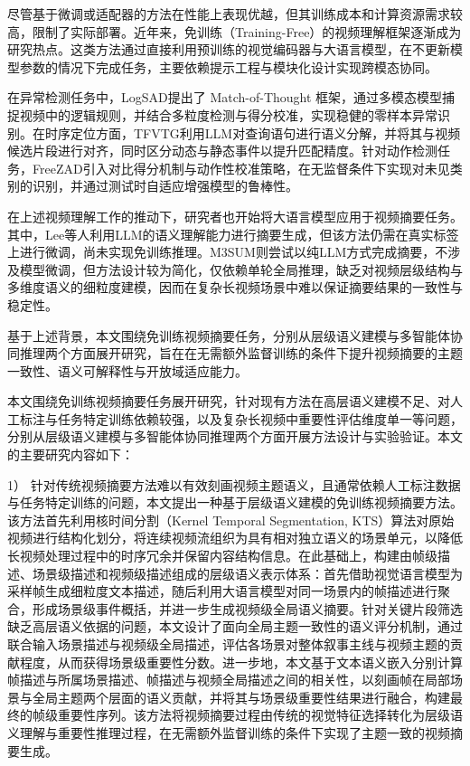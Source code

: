 尽管基于微调或适配器的方法在性能上表现优越，但其训练成本和计算资源需求较高，限制了实际部署。近年来，免训练（Training-Free）的视频理解框架逐渐成为研究热点。这类方法通过直接利用预训练的视觉编码器与大语言模型，在不更新模型参数的情况下完成任务，主要依赖提示工程与模块化设计实现跨模态协同。

在异常检测任务中，LogSAD\cite{zhang2025towards}提出了 Match-of-Thought 框架，通过多模态模型捕捉视频中的逻辑规则，并结合多粒度检测与得分校准，实现稳健的零样本异常识别。在时序定位方面，TFVTG\cite{zheng2024training}利用LLM对查询语句进行语义分解，并将其与视频候选片段进行对齐，同时区分动态与静态事件以提升匹配精度。针对动作检测任务，FreeZAD\cite{han2025training}引入对比得分机制与动作性校准策略，在无监督条件下实现对未见类别的识别，并通过测试时自适应增强模型的鲁棒性。

在上述视频理解工作的推动下，研究者也开始将大语言模型应用于视频摘要任务。其中，Lee等人\cite{lee2025video}利用LLM的语义理解能力进行摘要生成，但该方法仍需在真实标签上进行微调，尚未实现免训练推理。M3SUM\cite{wang2024m3sum}则尝试以纯LLM方式完成摘要，不涉及模型微调，但方法设计较为简化，仅依赖单轮全局推理，缺乏对视频层级结构与多维度语义的细粒度建模，因而在复杂长视频场景中难以保证摘要结果的一致性与稳定性。

基于上述背景，本文围绕免训练视频摘要任务，分别从层级语义建模与多智能体协同推理两个方面展开研究，旨在在无需额外监督训练的条件下提升视频摘要的主题一致性、语义可解释性与开放域适应能力。



本文围绕免训练视频摘要任务展开研究，针对现有方法在高层语义建模不足、对人工标注与任务特定训练依赖较强，以及复杂长视频中重要性评估维度单一等问题，分别从层级语义建模与多智能体协同推理两个方面开展方法设计与实验验证。本文的主要研究内容如下：

1） 针对传统视频摘要方法难以有效刻画视频主题语义，且通常依赖人工标注数据与任务特定训练的问题，本文提出一种基于层级语义建模的免训练视频摘要方法。该方法首先利用核时间分割（Kernel Temporal Segmentation, KTS）算法对原始视频进行结构化划分，将连续视频流组织为具有相对独立语义的场景单元，以降低长视频处理过程中的时序冗余并保留内容结构信息。在此基础上，构建由帧级描述、场景级描述和视频级描述组成的层级语义表示体系：首先借助视觉语言模型为采样帧生成细粒度文本描述，随后利用大语言模型对同一场景内的帧描述进行聚合，形成场景级事件概括，并进一步生成视频级全局语义摘要。针对关键片段筛选缺乏高层语义依据的问题，本文设计了面向全局主题一致性的语义评分机制，通过联合输入场景描述与视频级全局描述，评估各场景对整体叙事主线与视频主题的贡献程度，从而获得场景级重要性分数。进一步地，本文基于文本语义嵌入分别计算帧描述与所属场景描述、帧描述与视频全局描述之间的相关性，以刻画帧在局部场景与全局主题两个层面的语义贡献，并将其与场景级重要性结果进行融合，构建最终的帧级重要性序列。该方法将视频摘要过程由传统的视觉特征选择转化为层级语义理解与重要性推理过程，在无需额外监督训练的条件下实现了主题一致的视频摘要生成。

